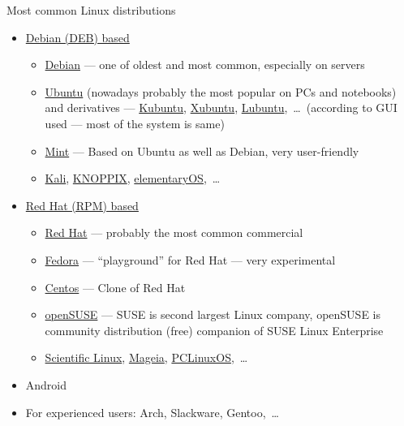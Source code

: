 \documentclass[compress, ucs, xelatex, 11pt, xcolor=svgnames,
  hyperref={
    bookmarks=true,
    unicode=true,
    colorlinks=true,
    pdftitle={Linux, command line and MetaCentrum},
    plainpages=false,
    pdfauthor={Vojtech Zeisek},
    pdfsubject={Course about use of Linux command line, writing shell scripts and using MetaCentrum of CESNET},
    pdfcreator={XeLaTeX},
    pdfkeywords={Linux, GNU, BASH, shell, command line, MetaCentrum},
    linkcolor=DarkRed,
    anchorcolor=DarkBlue,
    citecolor=Indigo,
    filecolor=NavyBlue,
    menucolor=DarkMagenta,
    urlcolor=DarkBlue,
    pdftex},
  url={hyphens, lowtilde} %
  ]{beamer}
\begin{document}
\begin{frame}{Most common Linux distributions}
  \begin{itemize}
    \item \href{https://distrowatch.com/search.php?package=DEB}{Debian (DEB) based}
    \begin{itemize}
      \item \href{https://www.debian.org/}{Debian} --- one of oldest and most common, especially on servers
      \item \href{http://www.ubuntu.com/}{Ubuntu} (nowadays probably the most popular on PCs and notebooks) and derivatives --- \href{https://www.kubuntu.org/}{Kubuntu}, \href{https://xubuntu.org/}{Xubuntu}, \href{http://lubuntu.net/}{Lubuntu},~\ldots~(according to GUI used --- most of the system is same)
      \item \href{https://linuxmint.com/}{Mint} --- Based on Ubuntu as well as Debian, very user-friendly
      \item \href{https://www.kali.org/}{Kali}, \href{http://knopper.net/knoppix/index-en.html}{KNOPPIX}, \href{https://elementary.io/}{elementaryOS},~\ldots
    \end{itemize}
    \item \href{https://distrowatch.com/search.php?package=RPM}{Red Hat (RPM) based}
    \begin{itemize}
      \item \href{https://www.redhat.com/}{Red Hat} --- probably the most common commercial
      \item \href{https://getfedora.org/}{Fedora} --- ``playground'' for Red Hat --- very experimental
      \item \href{https://www.centos.org/}{Centos} --- Clone of Red Hat
      \item \href{https://www.opensuse.org/}{openSUSE} --- SUSE is second largest Linux company, openSUSE is community distribution (free) companion of SUSE Linux Enterprise
      \item \href{https://www.scientificlinux.org/}{Scientific Linux}, \href{https://www.mageia.org/}{Mageia}, \href{https://www.pclinuxos.com/}{PCLinuxOS},~\ldots
    \end{itemize}
    \item Android
    \item For experienced users: Arch, Slackware, Gentoo,~\ldots
  \end{itemize}
\end{frame}
\end{document}
